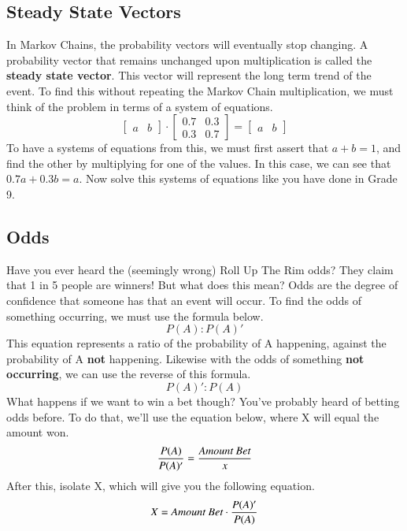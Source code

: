 \documentclass[final,1p,12pt]{elsarticle}
\begin{document}
    \subsection{Steady State Vectors}
    In Markov Chains, the probability vectors will eventually stop changing.
    A probability vector that remains unchanged upon multiplication is called the \textbf{steady state vector}.
    This vector will represent the long term trend of the event.
    To find this without repeating the Markov Chain multiplication, we must think of the problem in terms of a system of equations.
    \begin{equation*}
        \begin{bmatrix}
            a & b
        \end{bmatrix}
        \cdot
        \begin{bmatrix}
            0.7 & 0.3\\
            0.3 & 0.7
        \end{bmatrix}
        =
        \begin{bmatrix}
            a & b
        \end{bmatrix}
    \end{equation*}
    To have a systems of equations from this, we must first assert that $a + b = 1$, and find the other by multiplying for one of the values.
    In this case, we can see that $0.7a + 0.3b = a$.
    Now solve this systems of equations like you have done in Grade 9.
    
    \subsection{Odds}
    Have you ever heard the (seemingly wrong) Roll Up The Rim odds?
    They claim that 1 in 5 people are winners!
    But what does this mean?
    Odds are the degree of confidence that someone has that an event will occur.
    To find the odds of something occurring, we must use the formula below.
    \begin{equation*}
        P(A) : P(A)' 
    \end{equation*}
    This equation represents a ratio of the probability of A happening, against the probability of A \textbf{not} happening. Likewise with the odds of something \textbf{not occurring}, we can use the reverse of this formula.
    \begin{equation*}
        P(A)' : P(A)
    \end{equation*}
    What happens if we want to win a bet though? You've probably heard of betting odds before. To do that, we'll use the equation below, where X will equal the amount won.
    \begin{equation*}
        \frac{P(A)}{P(A)'} = \frac{\emph{Amount Bet}}{x}
    \end{equation*}
    After this, isolate X, which will give you the following equation.
    \begin{equation*}
        X = \emph{Amount Bet}\cdot\frac{P(A)'}{P(A)}
    \end{equation*}
\end{document}
